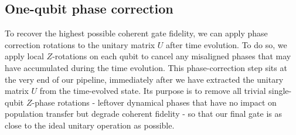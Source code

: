 \documentclass{subfiles}
\begin{document}
\subsection{One-qubit phase correction}\label{sec:phase_correction}
To recover the highest possible coherent gate fidelity, we can apply phase correction rotations to the unitary matrix $U$ after time evolution. To do so, we apply local $Z$-rotations on each qubit to cancel any misaligned phases that may have accumulated during the time evolution. This phase-correction step sits at the very end of our pipeline, immediately after we have extracted the unitary matrix $U$ from the time-evolved state. Its purpose is to remove all trivial single-qubit $Z$-phase rotations - leftover dynamical phases that have no impact on population transfer but degrade coherent fidelity - so that our final gate is as close to the ideal unitary operation as possible.
\end{document}
